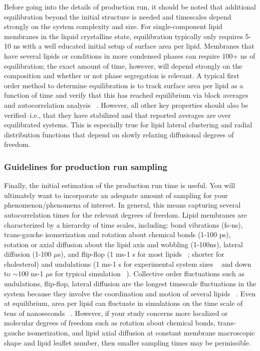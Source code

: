 \documentclass[9pt,bestpractices,pubversion]{livecoms}
\begin{document}
Before going into the details of production run, it should be noted that additional equilibration beyond the initial structure is needed and timescales depend strongly on the system complexity and size.
For single-component lipid membranes in the liquid crystalline state, equilibration typically only requires 5-10 ns with a well educated initial setup of surface area per lipid.
Membranes that have several lipids or conditions in more condensed phases can require 100+ ns of equilibration; the exact amount of time, however, will depend strongly on the composition and whether or not phase segregation is relevant.
A typical first order method to determine equilibration is to track surface area per lipid as a function of time and verify that this has reached equilibrium via block averages and autocorrelation analysis ~\cite{Venable2015}.
However, all other key properties should also be verified--i.e., that they have stabilized and that reported averages are over equilibrated systems.
This is especially true for lipid lateral clustering and radial distribution functions that depend on slowly relaxing diffusional degrees of freedom.

\subsubsection{Guidelines for production run sampling}
\label{subsubsec:prodrun}
Finally, the initial estimation of the production run time is useful.
You will ultimately want to incorporate an adequate amount of sampling for your phenomenon/phenomena of interest.
In general, this means capturing several autocorrelation times for the relevant degrees of freedom.
Lipid membranes are characterized by a hierarchy of time scales, including: bond vibrations (fs-ns), trans-gauche isomerization and rotation about chemical bonds (1-100 ps), rotation or axial diffusion about the lipid axis and wobbling (1-100ns), lateral diffusion (1-100 $\mu$s), and flip-flop (1 ms-1 s for most lipids ~\cite{Vermeer2007,Konig1996,Leftin2011}; shorter for cholesterol) and undulations (1 ms-1 s for experimental system sizes ~\cite{Vermeer2007} and down to $\sim$100 ns-1 $\mu$s for typical simulation ~\cite{Bochicchio2016}).
Collective order fluctuations such as undulations, flip-flop, lateral diffusion are the longest timescale fluctuations in the system because they involve the coordination and motion of several lipids  ~\cite{Vermeer2007}.
Even at equilibrium, area per lipid can fluctuate in simulations on the time scale of tens of nanoseconds  ~\cite{Poger2016,Venable2015}.
However, if your study concerns more localized or molecular degrees of freedom such as rotation about chemical bonds, trans-gauche isomerization, and lipid axial diffusion at constant membrane macroscopic shape and lipid leaflet number, then smaller sampling times may be permissible.
\end{document}
